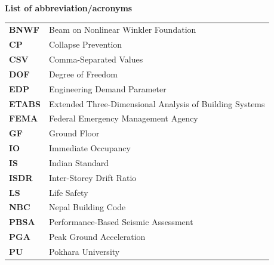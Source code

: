 \begin{titlepage}

    \begin{center}
        {\fontsize{14}{18}\selectfont \textbf{List of abbreviation/acronyms}}
    \end{center}

    \vspace*{12pt} 

    \vspace*{48pt} 

    {\fontsize{12}{14}\selectfont
    \noindent
    \begin{tabular}{@{}p{2.8cm}p{11.0cm}@{}}
        \textbf{BNWF}  & Beam on Nonlinear Winkler Foundation \\[0.5ex]
        \textbf{CP}    & Collapse Prevention \\[0.5ex]
        \textbf{CSV}   & Comma-Separated Values \\[0.5ex]
        \textbf{DOF}   & Degree of Freedom \\[0.5ex]
        \textbf{EDP}   & Engineering Demand Parameter \\[0.5ex]
        \textbf{ETABS} & Extended Three-Dimensional Analysis of Building Systems \\[0.5ex]
        \textbf{FEMA}  & Federal Emergency Management Agency \\[0.5ex]
        \textbf{GF}    & Ground Floor \\[0.5ex]
        \textbf{IO}    & Immediate Occupancy \\[0.5ex]
        \textbf{IS}    & Indian Standard \\[0.5ex]
        \textbf{ISDR}  & Inter-Storey Drift Ratio \\[0.5ex]
        \textbf{LS}    & Life Safety \\[0.5ex]
        \textbf{NBC}   & Nepal Building Code \\[0.5ex]
        \textbf{PBSA}  & Performance-Based Seismic Assessment \\[0.5ex]
        \textbf{PGA}   & Peak Ground Acceleration \\[0.5ex]
        \textbf{PU}    & Pokhara University \\[0.5ex]

\end{tabular}}
\end{titlepage}

